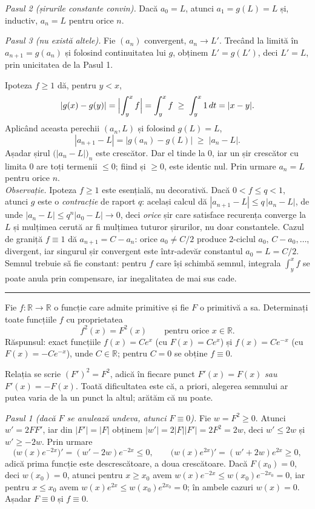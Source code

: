\noindent\textit{Pasul 2 (șirurile constante convin).} Dacă $a_0=L$, atunci
$a_1=g(L)=L$ și, inductiv, $a_n=L$ pentru orice $n$.

\noindent\textit{Pasul 3 (nu există altele).} Fie $(a_n)$ convergent, $a_n\to L'$.
Trecând la limită în $a_{n+1}=g(a_n)$ și folosind continuitatea lui $g$, obținem
$L'=g(L')$, deci $L'=L$, prin unicitatea de la Pasul 1.

Ipoteza $f\ge1$ dă, pentru $y<x$,
\[ |g(x)-g(y)|=\Bigl|\int_y^x f\Bigr|=\int_y^x f\;\ge\;\int_y^x 1\,dt=|x-y| . \]
Aplicând aceasta perechii $(a_n,L)$ și folosind $g(L)=L$,
\[ |a_{n+1}-L|=|g(a_n)-g(L)|\;\ge\;|a_n-L| . \]
Așadar șirul $\bigl(|a_n-L|\bigr)_{n}$ este crescător. Dar el tinde la $0$, iar
un șir crescător cu limita $0$ are toți termenii $\le0$; fiind și $\ge0$, este
identic nul. Prin urmare $a_n=L$ pentru orice $n$.\\[2pt]
\emph{Observație.} Ipoteza $f\ge1$ este esențială, nu decorativă. Dacă
$0<f\le q<1$, atunci $g$ este o \emph{contracție} de raport $q$: același calcul dă
$|a_{n+1}-L|\le q\,|a_n-L|$, de unde $|a_n-L|\le q^n|a_0-L|\to0$, deci
\emph{orice} șir care satisface recurența converge la $L$ și mulțimea cerută ar fi
mulțimea tuturor șirurilor, nu doar constantele. Cazul de graniță $f\equiv1$ dă
$a_{n+1}=C-a_n$: orice $a_0\neq C/2$ produce $2$-ciclul $a_0,\,C-a_0,\dots$,
divergent, iar singurul șir convergent este într-adevăr constantul $a_0=L=C/2$.
Semnul trebuie să fie constant: pentru $f$ care își schimbă semnul, integrala
$\int_y^x f$ se poate anula prin compensare, iar inegalitatea de mai sus cade.
\vspace{1mm}\hrule

Fie $f:\mathbb{R}\to\mathbb{R}$ o funcție care admite primitive și fie $F$ o
primitivă a sa. Determinați toate funcțiile $f$ cu proprietatea
\[ f^2(x)=F^2(x)\qquad\text{pentru orice }x\in\mathbb{R}. \]
\sol Răspunsul: exact funcțiile $f(x)=Ce^{x}$ (cu $F(x)=Ce^{x}$) și
$f(x)=Ce^{-x}$ (cu $F(x)=-Ce^{-x}$), unde $C\in\mathbb{R}$; pentru $C=0$ se obține
$f\equiv0$.

Relația se scrie $(F')^2=F^2$, adică în fiecare punct $F'(x)=F(x)$ \emph{sau}
$F'(x)=-F(x)$. Toată dificultatea este că, a priori, alegerea semnului ar putea
varia de la un punct la altul; arătăm că nu poate.

\noindent\textit{Pasul 1 (dacă $F$ se anulează undeva, atunci $F\equiv0$).}
Fie $w=F^2\ge0$. Atunci $w'=2FF'$, iar din $|F'|=|F|$ obținem
$|w'|=2|F||F'|=2F^2=2w$, deci $w'\le2w$ și $w'\ge-2w$. Prin urmare
\[ \bigl(w(x)e^{-2x}\bigr)'=(w'-2w)e^{-2x}\le0,\qquad
   \bigl(w(x)e^{2x}\bigr)'=(w'+2w)e^{2x}\ge0, \]
adică prima funcție este descrescătoare, a doua crescătoare. Dacă $F(x_0)=0$,
deci $w(x_0)=0$, atunci pentru $x\ge x_0$ avem $w(x)e^{-2x}\le w(x_0)e^{-2x_0}=0$,
iar pentru $x\le x_0$ avem $w(x)e^{2x}\le w(x_0)e^{2x_0}=0$; în ambele cazuri
$w(x)=0$. Așadar $F\equiv0$ și $f\equiv0$.


